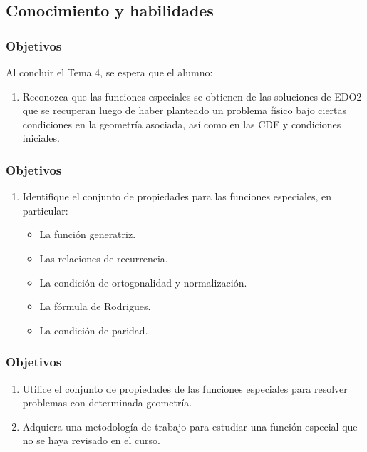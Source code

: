 \documentclass[12pt]{beamer}
\begin{document}
\subsection{Conocimiento y habilidades}

\begin{frame}
\frametitle{Objetivos}
Al concluir el Tema 4, se espera que el alumno:
\begin{enumerate}
\item Reconozca que las funciones especiales se obtienen de las soluciones de EDO2 que se recuperan luego de haber planteado un problema físico bajo ciertas condiciones en la geometría asociada, así como en las CDF y condiciones iniciales.                            
\seti
\end{enumerate}
\end{frame}
\begin{frame}
\frametitle{Objetivos}
\begin{enumerate}[<+->]
\conti
\item Identifique el conjunto de propiedades para las funciones especiales, en particular:
\begin{itemize}
\item La función generatriz.
\item Las relaciones de recurrencia.
\item La condición de ortogonalidad y normalización.
\item La fórmula de Rodrigues.
\item La condición de paridad.
\end{itemize}
\seti
\end{enumerate}
\end{frame}
\begin{frame}
\frametitle{Objetivos}
\begin{enumerate}[<+->]
\conti
\item Utilice el conjunto de propiedades de las funciones especiales para resolver problemas con determinada geometría.
\item Adquiera una metodología de trabajo para estudiar una función especial que no se haya revisado en el curso.
\end{enumerate}
\end{frame}
\end{document}
